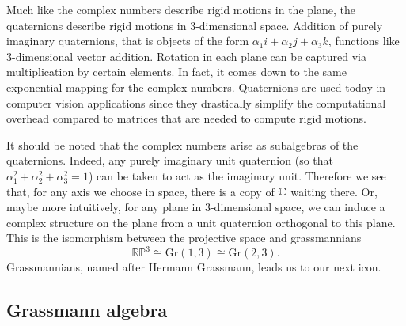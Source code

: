 \documentclass[12pt]{article}
\begin{document}
Much like the complex numbers describe rigid motions in the plane, the quaternions describe rigid motions in 3-dimensional space. Addition of purely imaginary quaternions, that is objects of the form $\alpha_1 i + \alpha_2 j + \alpha_3 k$, functions like 3-dimensional vector addition. Rotation in each plane can be captured via multiplication by certain elements. In fact, it comes down to the same exponential mapping for the complex numbers. Quaternions are used today in computer vision applications since they drastically simplify the computational overhead compared to matrices that are needed to compute rigid motions. 

It should be noted that the complex numbers arise as subalgebras of the quaternions. Indeed, any purely imaginary unit quaternion (so that $\alpha_1^2+\alpha_2^2+\alpha_3^2=1$) can be taken to act as the imaginary unit. Therefore we see that, for any axis we choose in space, there is a copy of $\mathbb{C}$ waiting there. Or, maybe more intuitively, for any plane in 3-dimensional space, we can induce a complex structure on the plane from a unit quaternion orthogonal to this plane. This is the isomorphism between the projective space and grassmannians 
\begin{equation}
\label{eq:isomorphisms}
\mathbb{RP}^3\cong \mathrm{Gr}(1,3)\cong \mathrm{Gr}(2,3).
\end{equation}
Grassmannians, named after Hermann Grassmann, leads us to our next icon.


\subsection{Grassmann algebra}
\end{document}
